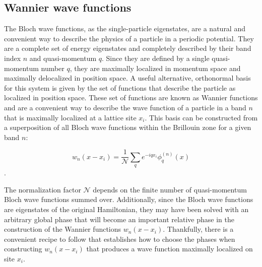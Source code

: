 \subsection{Wannier wave functions}

The Bloch wave functions, as the single-particle eigenstates, are a natural and convenient way to describe the physics of a particle in a periodic potential. They are a complete set of energy eigenstates and completely described by their band index $n$ and quasi-momentum $q$. Since they are defined by a single quasi-momentum number $q$, they are maximally localized in momentum space and maximally delocalized in position space. A useful alternative, orthonormal basis for this system is given by the set of functions that describe the particle as localized in position space. These set of functions are known as Wannier functions and are a convenient way to describe the wave function of a particle in a band $n$ that is maximally localized at a lattice site $x_i$. This basis can be constructed from a superposition of all Bloch wave functions within the Brillouin zone for a given band $n$:

\begin{equation}
w_n(x-x_i) = \frac{1}{\mathcal{N}} \sum_q e^{-i q x_i} \phi_q^{(n)} (x)
\label{eqn:wnfx}
\end{equation}.

The normalization factor $\mathcal{N}$ depends on the finite number of quasi-momentum Bloch wave functions summed over. Additionally, since the Bloch wave functions are eigenstates of the original Hamiltonian, they may have been solved with an arbitrary global phase that will become an important relative phase in the construction of the Wannier functions $w_n(x-x_i)$. Thankfully, there is a convenient recipe to follow that establishes how to choose the phases when constructing $w_n(x-x_i)$ that produces a wave function maximally localized on site $x_i$.

